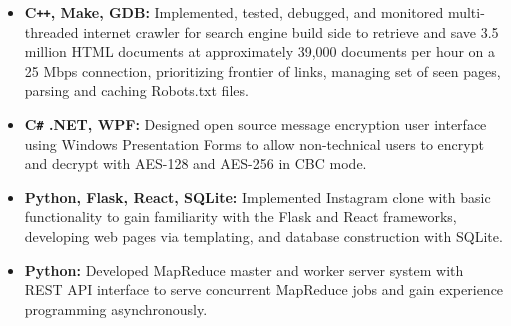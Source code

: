\documentclass[overlapped]{res}
\begin{document}
\begin{resume}
\begin{itemize}[label={}]  \itemsep -2pt %
    \item \textbf{C\texttt{++}, Make, GDB:}
        Implemented, tested, debugged, and monitored multi-threaded internet crawler
        for search engine build side to retrieve and save 3.5 million HTML documents
        at approximately 39,000 documents per hour on a 25 Mbps connection,
        prioritizing frontier of links, managing set of seen pages, parsing and caching Robots.txt files.
    \item \textbf{C\texttt{\#} .NET, WPF:}
        Designed open source message encryption user interface using
        Windows Presentation Forms to allow non-technical users
        to encrypt and decrypt with AES-128 and AES-256 in CBC mode.
    \item \textbf{Python, Flask, React, SQLite:}
        Implemented Instagram clone with basic functionality 
        to gain familiarity with the Flask and React frameworks, 
        developing web pages via templating, 
        and database construction with SQLite.
    \item \textbf{Python:}
        Developed MapReduce master and worker server system 
        with REST API interface to serve concurrent MapReduce jobs
        and gain experience programming asynchronously.
\end{itemize}


\end{resume}
\end{document}
